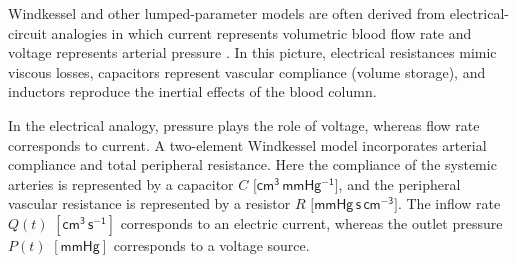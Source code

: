 \documentclass[alpha-refs, 12pt]{wiley-article}
\begin{document}
Windkessel and other lumped-parameter models are often derived from electrical-circuit analogies in which current represents volumetric blood flow rate and voltage represents arterial pressure \cite{Avolio1980, Segers1998, Milisic2004}. In this picture, electrical resistances mimic viscous losses, capacitors represent vascular compliance (volume storage), and inductors reproduce the inertial effects of the blood column.

In the electrical analogy, pressure plays the role of voltage, whereas flow rate corresponds to current.  A two-element Windkessel model incorporates arterial compliance and total peripheral resistance. Here the compliance of the systemic arteries is represented by a capacitor \(\!C\) \(\bigl[\mathsf{cm^{3}\,mmHg^{-1}}\bigr]\), and the peripheral vascular resistance is represented by a resistor \(R\) \(\bigl[\mathsf{mmHg\,s\,cm^{-3}}\bigr]\). The inflow rate \(Q(t)\) \([\mathsf{cm^{3}\,s^{-1}}]\) corresponds to an electric current, whereas the outlet pressure \(P(t)\) \([\mathsf{mmHg}]\) corresponds to a voltage source.
\end{document}
